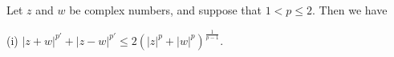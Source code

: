 Let $z$ and $w$ be complex numbers, and suppose that $1 < p \leq 2$. Then we have

(i) $|z + w|^{p'} + |z - w|^{p'} \leq 2(|z|^p + |w|^p)^{\frac{1}{p-1}}$.